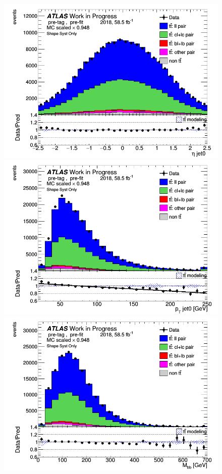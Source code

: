 \documentclass[letterpaper,12pt]{article}
\begin{document}
\begin{figure}[H]
\begin{minipage}[b]{.45\textwidth}
	\includegraphics[width=1\textwidth]{Distribution_March_highpT/DataMC_J0_eta.png}
	\end{minipage}\hfill
	\begin{minipage}[b]{.45\textwidth}
	\centering
	\includegraphics[width=1\textwidth]{Distribution_March_highpT/DataMC_J0_pt.png}
	\end{minipage}\hfill
	\begin{minipage}[b]{.45\textwidth}
	\centering
	\includegraphics[width=1\textwidth]{Distribution_March_highpT/DataMC_Mbb.png}

\end{minipage}
\end{figure}
\end{document}
